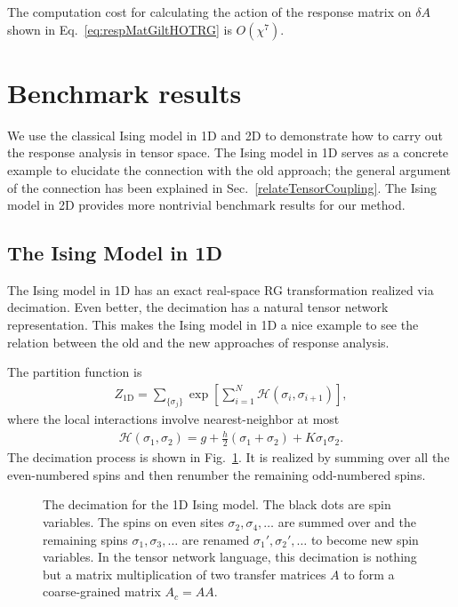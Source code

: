 \documentclass[aps,prb,reprint,superscriptaddress,floatfix]{revtex4-2}
\begin{document}
The computation cost for calculating the action of the response matrix
on $\delta A$ shown in Eq.~\eqref{eq:respMatGiltHOTRG} is $O(\chi^7)$.

\section{Benchmark results\label{benchmark}}
We use the classical Ising model in 1D and 2D to demonstrate how to carry out
the response analysis in tensor space. The Ising model in 1D serves as a
concrete example to elucidate the connection with the old approach; the
general argument of the connection has been explained in
Sec.~\ref{relateTensorCoupling}. The Ising model in 2D provides more
nontrivial benchmark results for our method.
%

\subsection{The Ising Model in 1D\label{benchmark:1DIsing}}
The Ising model in 1D has an exact real-space RG transformation realized via
decimation. Even better, the decimation has a natural tensor
network representation. This makes the Ising model in 1D a nice example to see
the relation between the old and the new approaches of response
analysis.
%

The partition function is
%
\begin{align}\label{def:Z4Ising1D}
    Z_{\text{1D}} = \sum_{\{\sigma_j \} } \exp{\left[\sum_{i=1}^N
    \mathscr{H}\left(\sigma_i,\sigma_{i+1}\right)  \right]},
\end{align}
%
where the local interactions involve nearest-neighbor at most
%
\begin{align}\label{def:H4Ising1D}
    \mathscr{H}\left(\sigma_1, \sigma_2\right) = g +
    \frac{h}{2}\left(\sigma_1 + \sigma_2\right) + K\sigma_1 \sigma_2.
\end{align}
%
The decimation process is shown in Fig.~\ref{fig:Ising1D-decimation}.
It is realized by summing over all the even-numbered spins and then
renumber the remaining odd-numbered spins. 
%
\begin{figure}[h]
    \caption{\label{fig:Ising1D-decimation}The decimation for the 1D
    Ising model. The black dots are spin variables. The spins on even
sites $\sigma_2,\sigma_4,\ldots$ are summed over and the remaining spins
$\sigma_1,\sigma_3,\ldots$ are renamed $\sigma_1',\sigma_2',\ldots$ to
become new spin variables. In the tensor network language, this
decimation is nothing but a matrix multiplication of two transfer matrices
$A$ to form a coarse-grained matrix $A_c = AA$.}
\end{figure}
%
\end{document}
